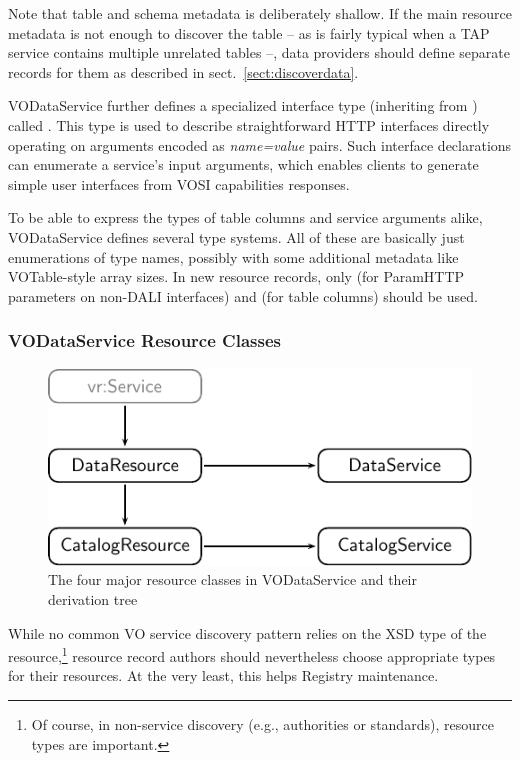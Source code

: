 \documentclass[11pt,a4paper]{ivoa}
\begin{document}
Note that table and schema metadata is deliberately shallow.  If the
main resource metadata is not enough to discover the table -- as is
fairly typical when a TAP service contains multiple unrelated tables --,
data providers should define separate records for them as described in
sect.~\ref{sect:discoverdata}.

VODataService further defines a specialized interface type
(inheriting from ) called
.  This type is used to describe
straightforward HTTP interfaces directly operating on
arguments encoded as
\emph{name=value} pairs.  Such interface declarations can
enumerate a service's input arguments, which enables clients
to generate simple
user interfaces from VOSI capabilities responses.

To be able to express the types of table columns and service arguments
alike, VODataService defines several type systems.  All of these are
basically just enumerations of type names, possibly with some additional
metadata like VOTable-style array sizes.  In new resource records, only
 (for ParamHTTP parameters on non-DALI
interfaces) and
 (for table columns) should be used.

\subsubsection{VODataService Resource Classes}
\label{sect:rescls}

\begin{figure}
\includegraphics{resclasses.pdf}
\caption{The four major resource classes in VODataService and their
derivation tree}
\label{fig:rescls}
\end{figure}

While no common VO service discovery pattern relies on the XSD type  of the
resource,\footnote{Of course, in non-service discovery (e.g., authorities
or standards), resource types are important.} resource
record authors should
nevertheless choose appropriate types for their resources.  At the
very least, this helps Registry maintenance.
\end{document}
